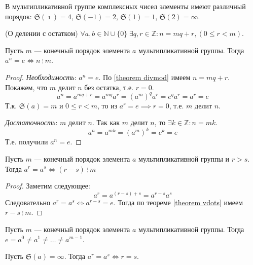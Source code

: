 \begin{example}
    В мультипликативной группе комплексных чисел элементы имеют различный порядок: $\mathfrak{S}(\imath) = 4$, $\mathfrak{S}(-1) = 2$, $\mathfrak{S}(1) = 1$, $\mathfrak{S}(2) = \infty$.
\end{example}

\begin{theorem}\label{theorem divmod}
    (О делении с остатком) $\forall a, b \in \mathbb{N}\cup\{0\}\;\exists q, r \in \mathbb{Z}: n = mq + r, (0 \leq r < m)$.
\end{theorem}

\begin{theorem}\label{theorem vdots}
    Пусть $m$ --- конечный порядок элемента $a$ мультипликативной группы. Тогда $a^n = e \iff n \ \vdots \ m$.
\end{theorem}
\begin{proof}
    \textit{Необходимость}: $a^n=e$. По \ref{theorem divmod} имеем $n = mq + r$. Покажем, что $m$ делит $n$ без остатка, т.е. $r = 0$.
    \begin{equation*}
        a^n = a^{mq +r}= a^{mq} a^r = (a^m)^q a^r = e^q a^r = a^r = e
    \end{equation*}
    Т.к. $\mathfrak{S}(a) = m$ и $0 \leq r < m$, то из $a^r = e \implies r = 0$, т.е. $m$ делит $n$.


    \textit{Достаточность}: $m$ делит $n$. Так как $m$ делит $n$, то $\exists k \in \mathbb{Z}: n = mk$.
    \begin{equation*}
        a^n = a^{mk} = (a^m)^k = e^k = e
    \end{equation*}
    Т.е. получили $a^n=e$.
\end{proof}

\begin{theorem}\label{theorem r - s}
    Пусть $m$ --- конечный порядок элемента $a$ мультипликативной группы и $r > s$. Тогда $a^r = a^s \iff (r - s) \ \vdots \ m$
\end{theorem}
\begin{proof}
    Заметим следующее:
    \begin{equation*}
        a^r = a^{(r-s)+s} = a^{r-s}a^s
    \end{equation*}
    Следовательно $a^r = a ^s \iff a^{r-s} = e$. Тогда по теореме \ref{theorem vdots} имеем $r -s \ \vdots \ m$.
\end{proof}
\begin{consequence}
    Пусть $m$ --- конечный порядок элемента $a$ мультипликативной группы. Тогда $e = a^0 \neq a^1 \neq \dots \neq a^{m-1}$.
\end{consequence}
\begin{consequence}
    Пусть $\mathfrak{S}(a) = \infty$. Тогда $a^r = a^s \iff r = s$.
\end{consequence}


